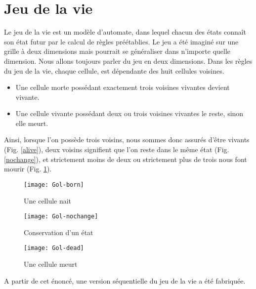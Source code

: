 \section{Jeu de la vie} %
\label{sec:jeu_de_la_vie}

Le jeu de la vie est un modèle d'automate, dans lequel chacun des états connaît son état futur par le calcul de règles préétablies. Le jeu a été imaginé sur une grille à deux dimensions mais pourrait se généraliser dans n'importe quelle dimension. Nous allons toujours parler du jeu en deux dimensions. Dans les règles du jeu de la vie, chaque cellule, est dépendante des huit cellules voisines.
\begin{itemize}
\item Une cellule morte possédant exactement trois voisines vivantes devient vivante.
\item Une cellule vivante possédant deux ou trois voisines vivantes le reste, sinon elle meurt.
\end{itemize}

Ainsi, lorsque l'on possède trois voisins, nous sommes donc assurés d'être vivants (Fig. \ref{alive}), deux voisins signifient que l'on reste dans le même état (Fig. \ref{nochange}), et strictement moins de deux ou strictement plus de trois nous font mourir (Fig. \ref{dead}).

\begin{figure}[h!]
\centering
\begin{minipage}{.3\textwidth}
\centering
\texttt{[image: Gol-born]}
\caption{Une cellule nait}
\label{alive}
\end{minipage}
\hspace{0.5cm}
\begin{minipage}{0.3\textwidth}
\centering
\texttt{[image: Gol-nochange]}
\caption{Conservation d'un état}
\label{nochange}
\end{minipage}
\hspace{0.5cm}
\begin{minipage}{.3\textwidth}
\centering
\texttt{[image: Gol-dead]}
\caption{Une cellule meurt}
\label{dead}
\end{minipage}
\end{figure}


A partir de cet énoncé, une version séquentielle du jeu de la vie a été fabriquée. 

